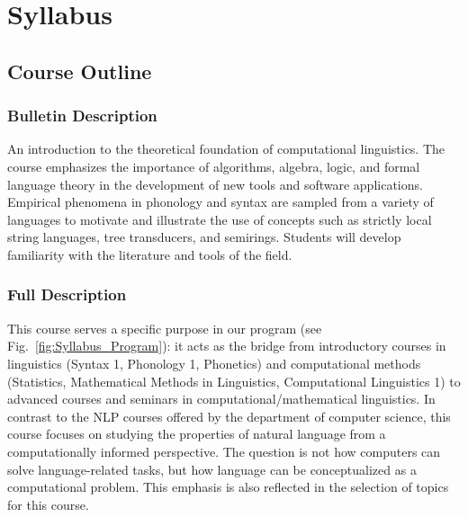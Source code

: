 \setcounter{chapter}{-1}
\chapter{Syllabus}
\label{cha:syllabus}
\setcounter{page}{1}


\section{Course Outline}

\subsection{Bulletin Description}
An introduction to the theoretical foundation of computational linguistics.
The course emphasizes the importance of algorithms, algebra, logic, and formal language theory in the development of new tools and software applications.
Empirical phenomena in phonology and syntax are sampled from a variety of languages to motivate and illustrate the use of concepts such as strictly local string languages, tree transducers, and semirings.
Students will develop familiarity with the literature and tools of the field.

\subsection{Full Description}

This course serves a specific purpose in our program (see Fig.~\vref{fig:Syllabus_Program}):
it acts as the bridge from introductory courses in linguistics (Syntax 1, Phonology 1, Phonetics) and computational methods (Statistics, Mathematical Methods in Linguistics, Computational Linguistics 1) to advanced courses and seminars in computational\slash mathematical linguistics.
In contrast to the NLP courses offered by the department of computer science, this course focuses on studying the properties of natural language from a computationally informed perspective.
The question is not how computers can solve language-related tasks, but how language can be conceptualized as a computational problem.
This emphasis is also reflected in the selection of topics for this course.

